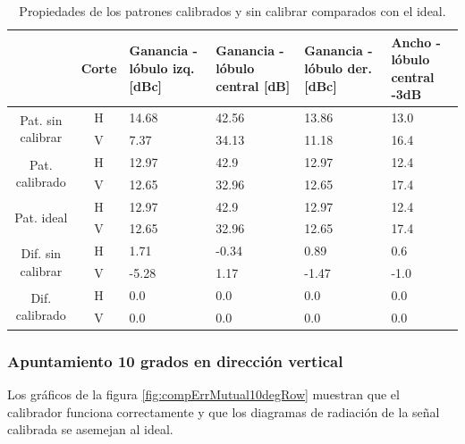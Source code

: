 \begin{table}[H]
  \footnotesize
  \centering
  \begin{tabular}{|c|c|p{2cm}|p{2.5cm}|p{2.5cm}|p{2.5cm}|}
    \cline{2-6}
    \multicolumn{1}{c|}{} & Corte & Ganancia - lóbulo izq. [dBc] & Ganancia - lóbulo central [dB] &
    Ganancia - lóbulo der. [dBc] & Ancho - lóbulo central -3dB \tabularnewline\hline
    \multirow{2}{2cm}{Pat. sin calibrar} & H & 14.68 & 42.56 & 13.86 & 13.0 \tabularnewline\cline{2-6}
     & V & 7.37 & 34.13 & 11.18 & 16.4 \tabularnewline\hline
    \multirow{2}{2cm}{Pat. calibrado} & H & 12.97 & 42.9 & 12.97 & 12.4 \tabularnewline\cline{2-6}
     & V & 12.65 & 32.96 & 12.65 & 17.4 \tabularnewline\hline
    \multirow{2}{2cm}{Pat. ideal} & H & 12.97 & 42.9 & 12.97 & 12.4 \tabularnewline\cline{2-6}
     & V & 12.65 & 32.96 & 12.65 & 17.4 \tabularnewline\hline
    \multirow{2}{2cm}{Dif. sin calibrar} & H & 1.71 & -0.34 & 0.89 & 0.6\tabularnewline\cline{2-6}
     & V & -5.28 & 1.17 & -1.47 & -1.0 \tabularnewline\hline
    \multirow{2}{2cm}{Dif. calibrado} & H & 0.0 & 0.0 & 0.0 & 0.0 \tabularnewline\cline{2-6}
     & V & 0.0 & 0.0 & 0.0 & 0.0 \tabularnewline\hline
  \end{tabular}
  \caption{Propiedades de los patrones calibrados y sin calibrar comparados con el ideal.}
  \label{tab:compErrMutual10degCol}
\end{table}


\subsubsection{Apuntamiento 10 grados en dirección vertical}

Los gráficos de la figura \ref{fig:compErrMutual10degRow} muestran que el calibrador funciona correctamente y que los diagramas de 
radiación de la señal calibrada se asemejan al ideal. 

